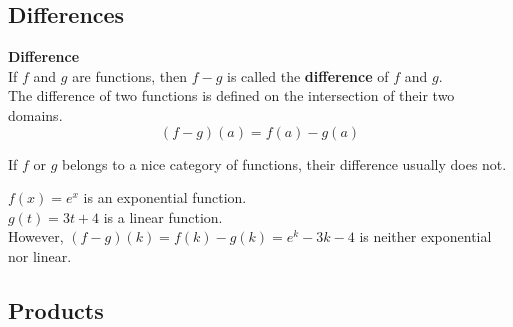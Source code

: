 \documentclass{ximera}
\begin{document}
\subsection*{Differences}



\begin{template}  \textbf{\textcolor{blue!55!black}{Difference}} \\


If  $f$ and $g$ are functions, then $f - g$ is called the \textbf{\textcolor{green!50!black}{difference}} of $f$ and $g$. \\

The difference of two functions is defined on the intersection of their two domains. \\


\[ (f - g)(a) = f(a) - g(a)  \]



\end{template}



\begin{warning}

If $f$ or $g$ belongs to a nice category of functions, their difference usually does not.

\end{warning}





\begin{example}

$f(x) = e^x$ is an exponential function. \\
$g(t) = 3 t + 4$ is a linear function. \\

However, $(f - g)(k) = f(k) - g(k) = e^k - 3 k - 4$ is neither exponential nor linear.

\end{example}
















\subsection*{Products}
\end{document}
